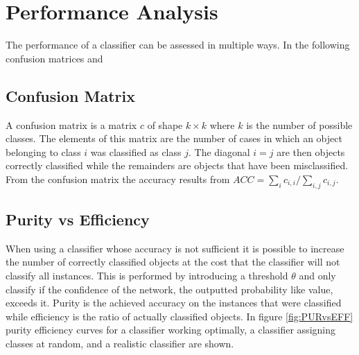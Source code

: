 %
%

\section{Performance Analysis}

The performance of a classifier can be assessed in multiple ways. In the following confusion matrices and 

\subsection{Confusion Matrix}
A confusion matrix is a matrix $c$ of shape $k\times k$ where $k$ is the number of possible classes. The elements of this matrix are the number of cases in which an object belonging to class $i$ was classified as class $j$. The diagonal $i=j$ are then objects correctly classified while the remainders are objects that have been misclassified. \\

From the confusion matrix the accuracy results from $ACC = \sum_i c_{i,i} / \sum_{i,j} c_{i,j}$.


\subsection{Purity vs Efficiency}

When using a classifier whose accuracy is not sufficient it is possible to increase the number of correctly classified objects at the cost that the classifier will not classify all instances. This is performed by introducing a threshold $\theta$ and only classify if the confidence of the network, the outputted probability like value, exceeds it. Purity is the achieved accuracy on the instances that were classified while efficiency is the ratio of actually classified objects. In figure \ref{fig:PURvsEFF} purity efficiency curves for a classifier working optimally, a classifier assigning classes at random, and a realistic classifier are shown. 

